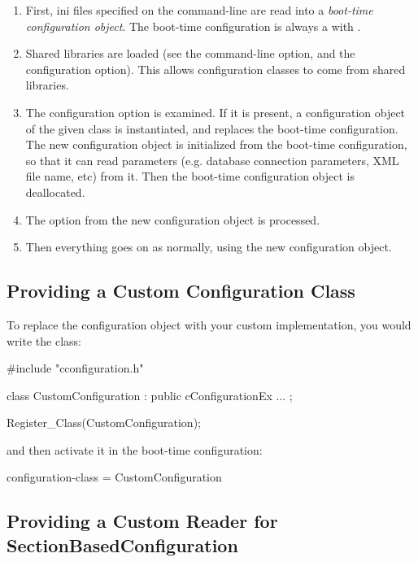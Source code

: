 \begin{enumerate}
  \item First, ini files specified on the command-line are read into a
     \textit{boot-time configuration object}. The boot-time configuration
     is always a  with
     .
  \item Shared libraries are loaded (see the  command-line option,
     and the  configuration option). This allows
     configuration classes to come from shared libraries.
  \item The  configuration option is examined.
     If it is present, a configuration object of the given class
     is instantiated, and replaces the boot-time configuration.
     The new configuration object is initialized from the boot-time
     configuration, so that it can read parameters (e.g. database
     connection parameters, XML file name, etc) from it.
     Then the boot-time configuration object is deallocated.
  \item The  option from the new configuration object is
     processed.
  \item Then everything goes on as normally, using the new configuration
     object.
\end{enumerate}

\subsection{Providing a Custom Configuration Class}

To replace the configuration object with your custom implementation,
you would write the class:

\begin{cpp}
#include "cconfiguration.h"

class CustomConfiguration : public cConfigurationEx
{
   ...
};

Register_Class(CustomConfiguration);
\end{cpp}

and then activate it in the boot-time configuration:

\begin{inifile}
[General]
configuration-class = CustomConfiguration
\end{inifile}


\subsection{Providing a Custom Reader for SectionBasedConfiguration}

